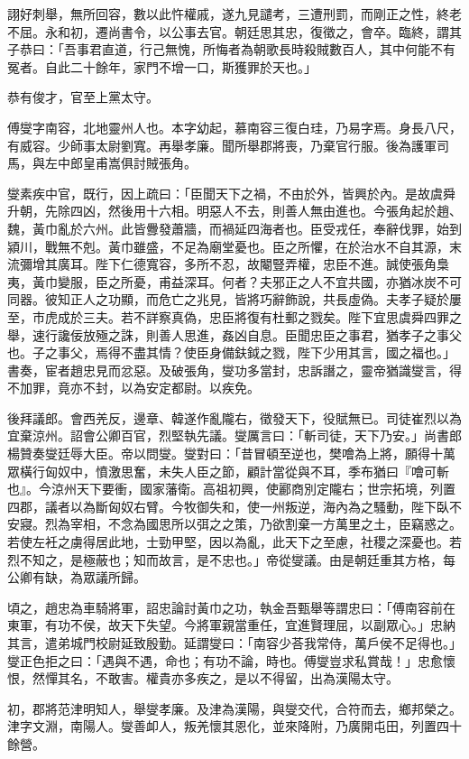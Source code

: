 \begin{pinyinscope}
詡好刺舉，無所回容，數以此忤權戚，遂九見譴考，三遭刑罰，而剛正之性，終老不屈。永和初，遷尚書令，以公事去官。朝廷思其忠，復徵之，會卒。臨終，謂其子恭曰：「吾事君直道，行己無愧，所悔者為朝歌長時殺賊數百人，其中何能不有冤者。自此二十餘年，家門不增一口，斯獲罪於天也。」

恭有俊才，官至上黨太守。

傅燮字南容，北地靈州人也。本字幼起，慕南容三復白珪，乃易字焉。身長八尺，有威容。少師事太尉劉寬。再舉孝廉。聞所舉郡將喪，乃棄官行服。後為護軍司馬，與左中郎皇甫嵩俱討賊張角。

燮素疾中官，既行，因上疏曰：「臣聞天下之禍，不由於外，皆興於內。是故虞舜升朝，先除四凶，然後用十六相。明惡人不去，則善人無由進也。今張角起於趙、魏，黃巾亂於六州。此皆釁發蕭牆，而禍延四海者也。臣受戎任，奉辭伐罪，始到潁川，戰無不剋。黃巾雖盛，不足為廟堂憂也。臣之所懼，在於治水不自其源，末流彌增其廣耳。陛下仁德寬容，多所不忍，故閹豎弄權，忠臣不進。誠使張角梟夷，黃巾變服，臣之所憂，甫益深耳。何者？夫邪正之人不宜共國，亦猶冰炭不可同器。彼知正人之功顯，而危亡之兆見，皆將巧辭飾說，共長虛偽。夫孝子疑於屢至，巿虎成於三夫。若不詳察真偽，忠臣將復有杜郵之戮矣。陛下宜思虞舜四罪之舉，速行讒佞放殛之誅，則善人思進，姦凶自息。臣聞忠臣之事君，猶孝子之事父也。子之事父，焉得不盡其情？使臣身備鈇鉞之戮，陛下少用其言，國之福也。」書奏，宦者趙忠見而忿惡。及破張角，燮功多當封，忠訴譖之，靈帝猶識燮言，得不加罪，竟亦不封，以為安定都尉。以疾免。

後拜議郎。會西羌反，邊章、韓遂作亂隴右，徵發天下，役賦無已。司徒崔烈以為宜棄涼州。詔會公卿百官，烈堅執先議。燮厲言曰：「斬司徒，天下乃安。」尚書郎楊贊奏燮廷辱大臣。帝以問燮。燮對曰：「昔冒頓至逆也，樊噲為上將，願得十萬眾橫行匈奴中，憤激思奮，未失人臣之節，顧計當從與不耳，季布猶曰『噲可斬也』。今涼州天下要衝，國家藩衛。高祖初興，使酈商別定隴右；世宗拓境，列置四郡，議者以為斷匈奴右臂。今牧御失和，使一州叛逆，海內為之騷動，陛下臥不安寢。烈為宰相，不念為國思所以弭之之策，乃欲割棄一方萬里之土，臣竊惑之。若使左衽之虜得居此地，士勁甲堅，因以為亂，此天下之至慮，社稷之深憂也。若烈不知之，是極蔽也；知而故言，是不忠也。」帝從燮議。由是朝廷重其方格，每公卿有缺，為眾議所歸。

頃之，趙忠為車騎將軍，詔忠論討黃巾之功，執金吾甄舉等謂忠曰：「傅南容前在東軍，有功不侯，故天下失望。今將軍親當重任，宜進賢理屈，以副眾心。」忠納其言，遣弟城門校尉延致殷勤。延謂燮曰：「南容少荅我常侍，萬戶侯不足得也。」燮正色拒之曰：「遇與不遇，命也；有功不論，時也。傅燮豈求私賞哉！」忠愈懷恨，然憚其名，不敢害。權貴亦多疾之，是以不得留，出為漢陽太守。

初，郡將范津明知人，舉燮孝廉。及津為漢陽，與燮交代，合符而去，鄉邦榮之。津字文淵，南陽人。燮善卹人，叛羌懷其恩化，並來降附，乃廣開屯田，列置四十餘營。


\end{pinyinscope}
